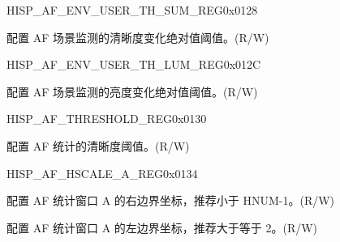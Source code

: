 \begin{register}{H}{ISP\_AF\_ENV\_USER\_TH\_SUM\_REG}{0x0128}\label{regdesc:ISPAFENVUSERTHSUMREG}
%
\regnewline%
\begin{regdesc}\begin{reglist}
\label{fielddesc:ISPAFENVUSERTHRESHOLDSUM}\item [ISP\_AF\_ENV\_USER\_THRESHOLD\_SUM] 配置 AF 场景监测的清晰度变化绝对值阈值。(R/W)
\end{reglist}\end{regdesc}
\end{register}


\begin{register}{H}{ISP\_AF\_ENV\_USER\_TH\_LUM\_REG}{0x012C}\label{regdesc:ISPAFENVUSERTHLUMREG}
%
%
\regnewline%
\begin{regdesc}\begin{reglist}
\label{fielddesc:ISPAFENVUSERTHRESHOLDLUM}\item [ISP\_AF\_ENV\_USER\_THRESHOLD\_LUM] 配置 AF 场景监测的亮度变化绝对值阈值。(R/W)
\end{reglist}\end{regdesc}
\end{register}


\begin{register}{H}{ISP\_AF\_THRESHOLD\_REG}{0x0130}\label{regdesc:ISPAFTHRESHOLDREG}
%
%
\regnewline%
\begin{regdesc}\begin{reglist}
\label{fielddesc:ISPAFTHRESHOLD}\item [ISP\_AF\_THRESHOLD] 配置 AF 统计的清晰度阈值。(R/W)
\end{reglist}\end{regdesc}
\end{register}


\begin{register}{H}{ISP\_AF\_HSCALE\_A\_REG}{0x0134}\label{regdesc:ISPAFHSCALEAREG}
%
%
%
%
\regnewline%
\begin{regdesc}\begin{reglist}
\label{fielddesc:ISPAFRPOINTA}\item [ISP\_AF\_RPOINT\_A] 配置 AF 统计窗口 A 的右边界坐标，推荐小于 HNUM-1。(R/W)
\label{fielddesc:ISPAFLPOINTA}\item [ISP\_AF\_LPOINT\_A] 配置 AF 统计窗口 A 的左边界坐标，推荐大于等于 2。(R/W)
\end{reglist}\end{regdesc}
\end{register}


